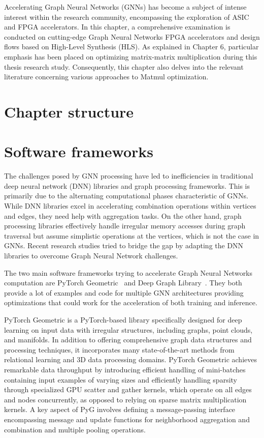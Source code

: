 Accelerating Graph Neural Networks (GNNs) has become a subject of intense interest within the research community, encompassing the exploration of ASIC and FPGA accelerators.
In this chapter, a comprehensive examination is conducted on cutting-edge Graph Neural Networks FPGA accelerators and design flows based on High-Level Synthesis (HLS).
As explained in Chapter 6, particular emphasis has been placed on optimizing matrix-matrix multiplication during this thesis research study.
Consequently, this chapter also delves into the relevant literature concerning various approaches to Matmul optimization.

\section{Chapter structure}
\label{sh:related_work_structure}


\section{Software frameworks}
\label{sec:related_work_software_frameworks}

The challenges posed by GNN processing have led to inefficiencies in traditional deep neural network (DNN) libraries and graph processing frameworks.
This is primarily due to the alternating computational phases characteristic of GNNs.
While DNN libraries excel in accelerating combination operations within vertices and edges, they need help with aggregation tasks.
On the other hand, graph processing libraries effectively handle irregular memory accesses during graph traversal but assume simplistic operations at the vertices, which is not the case in GNNs. Recent research studies tried to bridge the gap by adapting the DNN libraries to overcome Graph Neural Network challenges.

The two main software frameworks trying to accelerate Graph Neural Networks computation are PyTorch Geometric~\cite{DBLP:journals/corr/abs-1903-02428} and Deep Graph Library~\cite{DBLP:journals/corr/abs-1909-01315}.
They both provide a lot of examples and code for multiple GNN architectures providing optimizations that could work for the acceleration of both training and inference.

PyTorch Geometric is a PyTorch-based library specifically designed for deep learning on input data with irregular structures, including graphs, point clouds, and manifolds.
In addition to offering comprehensive graph data structures and processing techniques, it incorporates many state-of-the-art methods from relational learning and 3D data processing domains.
PyTorch Geometric achieves remarkable data throughput by introducing efficient handling of mini-batches containing input examples of varying sizes and efficiently handling sparsity through specialized GPU scatter and gather kernels, which operate on all edges and nodes concurrently, as opposed to relying on sparse matrix multiplication kernels.
A key aspect of PyG involves defining a message-passing interface encompassing message and update functions for neighborhood aggregation and combination and multiple pooling operations.

